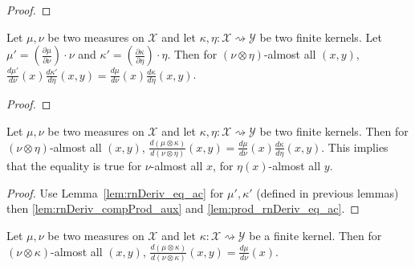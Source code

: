 \begin{proof} \leanok
\end{proof}

\begin{lemma}
  \label{lem:prod_rnDeriv_eq_ac}
  \leanok
  Let $\mu, \nu$ be two measures on $\mathcal X$ and let $\kappa, \eta : \mathcal X \rightsquigarrow \mathcal Y$ be two finite kernels. Let $\mu' = \left(\frac{\partial \mu}{\partial \nu}\right) \cdot \nu$ and $\kappa' = \left(\frac{\partial \kappa}{\partial \eta}\right) \cdot \eta$. Then for $(\nu \otimes \eta)$-almost all $(x, y)$, $\frac{d\mu'}{d\nu}(x)\frac{d \kappa'}{d \eta}(x,y) = \frac{d\mu}{d\nu}(x)\frac{d \kappa}{d \eta}(x,y)$.
\end{lemma}

\begin{proof} \leanok
\end{proof}

\begin{lemma}
  \label{lem:rnDeriv_compProd}
  \leanok
  Let $\mu, \nu$ be two measures on $\mathcal X$ and let $\kappa, \eta : \mathcal X \rightsquigarrow \mathcal Y$ be two finite kernels. Then for $(\nu \otimes \eta)$-almost all $(x, y)$, $\frac{d (\mu \otimes \kappa)}{d (\nu \otimes \eta)}(x,y) = \frac{d\mu}{d\nu}(x)\frac{d \kappa}{d \eta}(x,y)$.
  This implies that the equality is true for $\nu$-almost all $x$, for $\eta(x)$-almost all $y$.
\end{lemma}

\begin{proof} \leanok
{}
Use Lemma~\ref{lem:rnDeriv_eq_ac} for $\mu', \kappa'$ (defined in previous lemmas) then \ref{lem:rnDeriv_compProd_aux} and \ref{lem:prod_rnDeriv_eq_ac}.
\end{proof}

\begin{corollary}
  \label{cor:rnDeriv_compProd_left}
  \leanok
  Let $\mu, \nu$ be two measures on $\mathcal X$ and let $\kappa : \mathcal X \rightsquigarrow \mathcal Y$ be a finite kernel. Then for $(\nu \otimes \kappa)$-almost all $(x, y)$, $\frac{d (\mu \otimes \kappa)}{d (\nu \otimes \kappa)}(x,y) = \frac{d\mu}{d\nu}(x)$.
\end{corollary}


